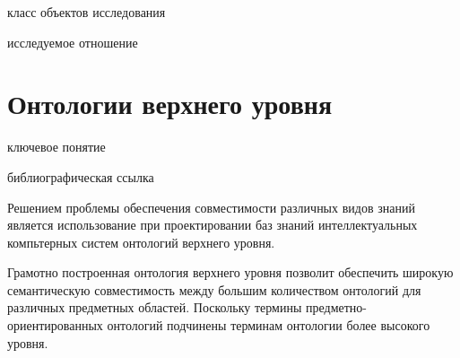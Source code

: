 \begin{SCn}
	\begin{scnhaselementrolelist}{класс объектов исследования}
	\end{scnhaselementrolelist}
	\begin{scnhaselementrolelist}{исследуемое отношение}
	\end{scnhaselementrolelist}
\end{SCn}

\section{Онтологии верхнего уровня}
\label{sec_top_level_ontologies}

\begin{SCn}
	\begin{scnrelfromlist}{ключевое понятие}
	\end{scnrelfromlist}
\end{SCn}

\begin{scnrelfromlist}{библиографическая ссылка}
\end{scnrelfromlist}

Решением проблемы обеспечения совместимости различных видов знаний является использование при проектировании баз знаний интеллектуальных компьтерных систем онтологий верхнего уровня.

Грамотно построенная онтология верхнего уровня позволит обеспечить широкую семантическую совместимость между большим количеством онтологий для различных предметных областей. Поскольку термины предметно-ориентированных онтологий подчинены терминам онтологии более высокого уровня.

